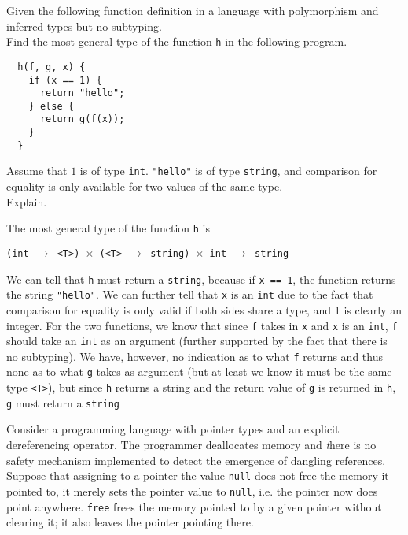 \documentclass[11pt]{exam}
\begin{document}
\begin{questions}

      \question Given the following function definition in a language
        with polymorphism and inferred types but no subtyping.\\
        Find the most general type of the function {\tt h} in the following program.
\begin{lstlisting}
  h(f, g, x) {
    if (x == 1) {
      return "hello";
    } else {
      return g(f(x));
    }
  }
\end{lstlisting}
        Assume that $1$ is of type {\tt int}. {\tt "hello"} is of type {\tt string},
        and comparison for equality is only available for two values of the same type. \\
        Explain.

	\begin{framed}

            The most general type of the function {\tt h} is

            {\tt (int $\to$ <T>) $\times$ (<T> $\to$ string) $\times$ int $\to$ string}

            We can tell that {\tt h} must return a {\tt string}, because if {\tt x == 1}, the function returns the string {\tt "hello"}. We can further tell that {\tt x} is an {\tt int} due to the fact that comparison for equality is only valid if both sides share a type, and 1 is clearly an integer. For the two functions, we know that since {\tt f} takes in {\tt x} and {\tt x} is an {\tt int}, {\tt f} should take an {\tt int} as an argument (further supported by the fact that there is no subtyping). We have, however, no indication as to what {\tt f} returns and thus none as to what {\tt g} takes as argument (but at least we know it must be the same type {\tt <T>}), but since {\tt h} returns a string and the return value of {\tt g} is returned in {\tt h}, {\tt g} must return a {\tt string}

	\end{framed}
\newpage

	\question Consider a programming language with pointer types and an explicit dereferencing operator. The programmer deallocates memory and {\emph there is no safety mechanism implemented to detect the emergence of dangling references}. Suppose that assigning to a pointer the value {\tt null} does not free the memory it pointed to, it merely sets the pointer value to {\tt null}, i.e. the pointer now does point anywhere. {\tt free} frees the memory pointed to by a given pointer without clearing it; it also leaves the pointer pointing there.


\end{questions}
\end{document}
